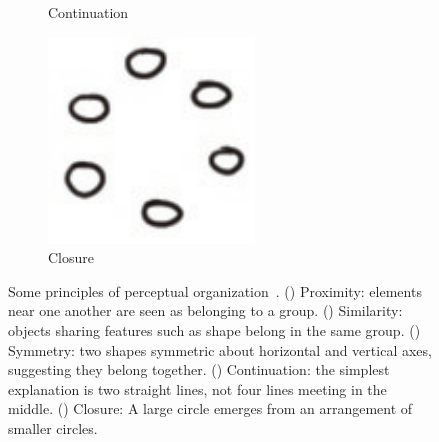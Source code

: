 \begin{figure}
\begin{subfigure}[b]{28mm}
    \caption{Continuation}
    \label{fig:gestalt-continuation}
  \end{subfigure}
  \hspace{2mm}
  \begin{subfigure}[b]{28mm} 
    \includegraphics[width=\textwidth]{img/gestalt-closure.pdf} 
    \caption{Closure}
    \label{fig:gestalt-closure}
  \end{subfigure}
  \caption[Gestalt Perceptual Organization]{Some principles of
    perceptual organization~\cite{kanizsa-gestalt}.
    () Proximity: elements near one
    another are seen as belonging to a
    group. () Similarity: objects
    sharing features such as shape belong in the same
    group. () Symmetry: two shapes
    symmetric about horizontal and vertical axes, suggesting they
    belong together. () Continuation:
    the simplest explanation is two straight lines, not four lines
    meeting in the middle. () Closure: A
    large circle emerges from an arrangement of smaller circles.}
  \label{fig:gestalt}
\end{figure}
